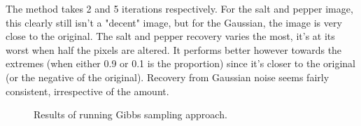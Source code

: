 \documentclass[]{article}
\begin{document}
        \par
        The method takes 2 and 5 iterations respectively. For the salt and pepper image, this clearly still isn’t a "decent" image, but for the Gaussian, the image is very close to the original. The salt and pepper recovery varies the most, it's at its worst when half the pixels are altered. It performs better however towards the extremes (when either 0.9 or 0.1 is the proportion) since it's closer to the original (or the negative of the original). Recovery from Gaussian noise seems fairly consistent, irrespective of the amount.
        \begin{figure}[h]
            \centering
            \caption{Results of running Gibbs sampling approach.}
            \label{fig:q2}
        \end{figure}
\end{document}
